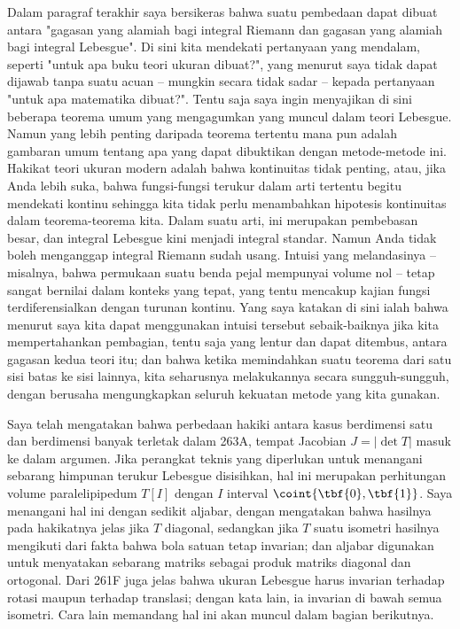 {Dalam paragraf terakhir saya bersikeras bahwa suatu pembedaan dapat
dibuat antara "gagasan yang alamiah bagi integral Riemann dan gagasan
yang alamiah bagi integral Lebesgue".   Di sini kita mendekati pertanyaan yang
mendalam, seperti "untuk apa buku teori ukuran dibuat?", yang menurut saya
tidak dapat dijawab tanpa suatu acuan -- mungkin secara tidak sadar --
kepada pertanyaan "untuk apa matematika dibuat?".   Tentu saja saya
ingin menyajikan di sini beberapa teorema umum yang mengagumkan yang
muncul dalam teori Lebesgue.   Namun yang lebih penting daripada teorema tertentu
mana pun adalah gambaran umum tentang apa yang dapat dibuktikan dengan metode-metode ini.
Hakikat teori ukuran modern adalah bahwa kontinuitas tidak
penting, atau, jika Anda lebih suka, bahwa fungsi-fungsi terukur dalam arti tertentu
begitu mendekati kontinu sehingga kita tidak perlu menambahkan hipotesis
kontinuitas dalam teorema-teorema kita.   Dalam suatu arti, ini merupakan pembebasan
besar, dan integral Lebesgue kini menjadi integral standar.   Namun Anda tidak
boleh menganggap integral Riemann sudah usang.   Intuisi yang melandasinya --
misalnya, bahwa permukaan suatu benda pejal mempunyai volume nol -- tetap
sangat bernilai dalam konteks yang tepat, yang tentu mencakup kajian
fungsi terdiferensialkan dengan turunan kontinu.   Yang saya katakan
di sini ialah bahwa menurut saya kita dapat menggunakan intuisi tersebut sebaik-baiknya
jika kita mempertahankan pembagian, tentu saja yang lentur dan dapat ditembus,
antara gagasan kedua teori itu;  dan bahwa ketika memindahkan suatu teorema
dari satu sisi batas ke sisi lainnya, kita seharusnya melakukannya
secara sungguh-sungguh, dengan berusaha mengungkapkan seluruh kekuatan metode yang
kita gunakan.

Saya telah mengatakan bahwa perbedaan hakiki antara
kasus berdimensi satu dan berdimensi banyak terletak dalam 263A, tempat Jacobian
$J=|\det T|$ masuk ke dalam argumen.   Jika perangkat teknis yang diperlukan
untuk menangani sebarang himpunan terukur Lebesgue disisihkan, hal ini
merupakan perhitungan volume paralelipipedum $T[I]$
dengan $I$ interval $\coint{\tbf{0},\tbf{1}}$.   Saya menangani
hal ini dengan sedikit aljabar, dengan mengatakan bahwa hasilnya pada hakikatnya
jelas jika $T$ diagonal, sedangkan jika $T$ suatu isometri hasilnya mengikuti
dari fakta bahwa bola satuan tetap invarian;  dan aljabar digunakan untuk
menyatakan sebarang matriks sebagai produk matriks diagonal dan ortogonal.
Dari 261F juga jelas bahwa ukuran Lebesgue
harus invarian terhadap rotasi maupun terhadap translasi;
dengan kata lain, ia invarian di bawah semua isometri.   Cara lain memandang
hal ini akan muncul dalam bagian berikutnya.

}
